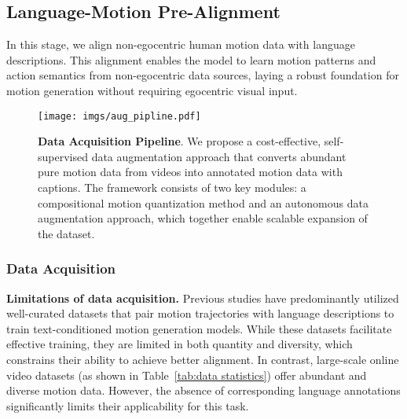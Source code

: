 \subsection{Language-Motion Pre-Alignment}
In this stage, we align non-egocentric human motion data with language descriptions. This alignment enables the model to learn motion patterns and action semantics from non-egocentric data sources, laying a robust foundation for motion generation without requiring egocentric visual input. 



\begin{figure*}
  \centering
   \texttt{[image: imgs/aug\_pipline.pdf]}
   \caption{\textbf{Data Acquisition Pipeline}. We propose a cost-effective, self-supervised data augmentation approach that converts abundant pure motion data from videos into annotated motion data with captions. The framework consists of two key modules: a compositional motion quantization method and an autonomous data augmentation approach, which together enable scalable expansion of the dataset.}
   \label{fig:templtes}
   \vspace{-1.5em}
\end{figure*}


\subsubsection{Data Acquisition}
\begin{table}
\centering
{}
\caption{\textbf{Datasets Statistics}}
\label{tab:data statistics}
\end{table}
\textbf{Limitations of data acquisition.}
Previous studies have predominantly utilized well-curated datasets that pair motion trajectories with language descriptions to train text-conditioned motion generation models. While these datasets facilitate effective training, they are limited in both quantity and diversity, which constrains their ability to achieve better alignment. In contrast, large-scale online video datasets (as shown in Table~\ref{tab:data statistics}) offer abundant and diverse motion data. However, the absence of corresponding language annotations significantly limits their applicability for this task.

